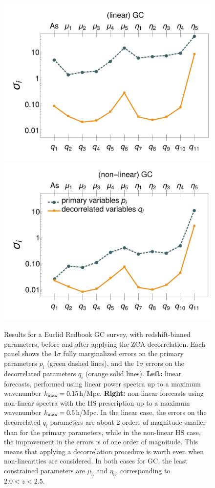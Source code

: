 \begin{figure}[htbp]
\centering{}\includegraphics[width=0.4\linewidth]{Chapters/linear-nonlinear-MG-forecasts/figures/Decorrelations-GC/Errors_at_par_index_i--_ZCA_SquareNorm--fiducialMGBin3_Euclid_GC_linearPK_}
\includegraphics[width=0.4\linewidth]{Chapters/linear-nonlinear-MG-forecasts/figures/Decorrelations-GC/Errors_at_par_index_i--_ZCA_SquareNorm--fiducialMGBin3_Euclid_GC_nonlinearPk__Zhao_}
\caption[1$\sigma$ forecasted errors on the primary and decorrelated parameters for Euclid GC.]{\label{fig:GCbinerrs}
Results for a Euclid Redbook GC survey, with redshift-binned parameters, before and after applying the ZCA decorrelation.
Each panel shows the 1$\sigma$ fully marginalized errors on the primary parameters $p_i$ (green dashed
lines), and the 1$\sigma$ errors on the decorrelated 
parameters $q_i$ (orange solid lines). \textbf{Left: } linear forecasts,
performed using linear power spectra up to a maximum wavenumber $k_{\rm max}=0.15$h/Mpc.
\textbf{Right: }non-linear forecasts using non-linear spectra with the HS prescription up to a maximum wavenumber $k_{\rm max}=0.5$h/Mpc.
In the linear case, the errors on the decorrelated $q_i$ parameters are about 2 orders of magnitude smaller than for the primary parameters, 
while in the non-linear HS case, the improvement in the errors is of one order of magnitude. This means that applying a decorrelation procedure is worth even when non-linearities are considered.
In both cases for GC, the least constrained parameters are $\mu_5$ and $\eta_5$, corresponding to $2.0 < z < 2.5$.}
\end{figure}

